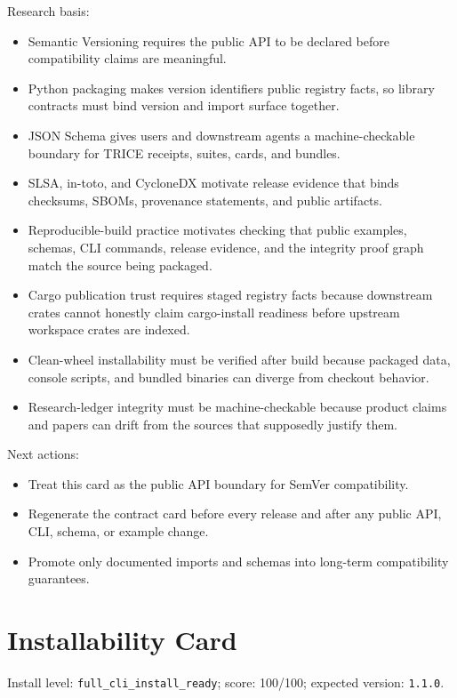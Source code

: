 \documentclass[10pt]{article}
\begin{document}
\noindent Research basis:
\begin{itemize}
\item Semantic Versioning requires the public API to be declared before compatibility claims are meaningful.
\item Python packaging makes version identifiers public registry facts, so library contracts must bind version and import surface together.
\item JSON Schema gives users and downstream agents a machine-checkable boundary for TRICE receipts, suites, cards, and bundles.
\item SLSA, in-toto, and CycloneDX motivate release evidence that binds checksums, SBOMs, provenance statements, and public artifacts.
\item Reproducible-build practice motivates checking that public examples, schemas, CLI commands, release evidence, and the integrity proof graph match the source being packaged.
\item Cargo publication trust requires staged registry facts because downstream crates cannot honestly claim cargo-install readiness before upstream workspace crates are indexed.
\item Clean-wheel installability must be verified after build because packaged data, console scripts, and bundled binaries can diverge from checkout behavior.
\item Research-ledger integrity must be machine-checkable because product claims and papers can drift from the sources that supposedly justify them.
\end{itemize}

\noindent Next actions:
\begin{itemize}
\item Treat this card as the public API boundary for SemVer compatibility.
\item Regenerate the contract card before every release and after any public API, CLI, schema, or example change.
\item Promote only documented imports and schemas into long-term compatibility guarantees.
\end{itemize}


        \section{Installability Card}
Install level: \texttt{full\_cli\_install\_ready}; score: 100/100; expected version: \texttt{1.1.0}.
\end{document}
